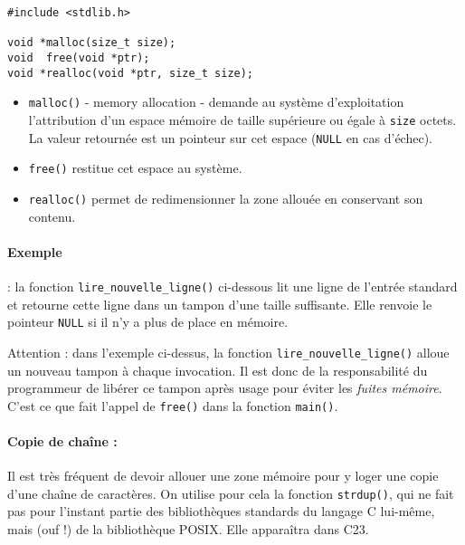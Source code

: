 
\extrait
\begin{lstlisting}
#include <stdlib.h>

void *malloc(size_t size);
void  free(void *ptr);
void *realloc(void *ptr, size_t size);
\end{lstlisting}


\begin{itemize}
\item \texttt{malloc()} - memory allocation -  demande au système d'exploitation 
l'attribution d'un espace mémoire
de taille supérieure ou égale à \texttt{size} octets.
La valeur retournée est un pointeur sur cet espace
(\texttt{NULL} en cas d'échec). 
\item \texttt{free()} restitue cet espace au système. 
\item \texttt{realloc()} permet de redimensionner la
zone allouée en conservant son contenu.
\end{itemize}


\paragraph*{Exemple} : la fonction \texttt{lire\_nouvelle\_ligne()}
ci-dessous lit une ligne de l'entrée standard et retourne cette ligne
dans un tampon d'une taille suffisante. Elle renvoie le pointeur
\texttt{NULL} si il n'y a plus de place en mémoire.


\source



Attention : dans l'exemple ci-dessus, la fonction
\texttt{lire\_nouvelle\_ligne()} alloue un nouveau tampon à chaque
invocation. Il est donc de la responsabilité du programmeur de libérer
ce tampon après usage pour éviter les \emph{fuites mémoire}. C'est ce
que fait l'appel de \texttt{free()} dans la fonction \texttt{main()}.

\paragraph{Copie de chaîne :}



Il est très fréquent de devoir allouer une zone mémoire pour y loger
une copie d'une chaîne de caractères. On utilise pour cela la fonction
\texttt{strdup()}, qui ne fait pas pour l'instant partie des
bibliothèques standards du langage C lui-même, mais (ouf !) de la
bibliothèque POSIX. Elle apparaîtra dans C23.

